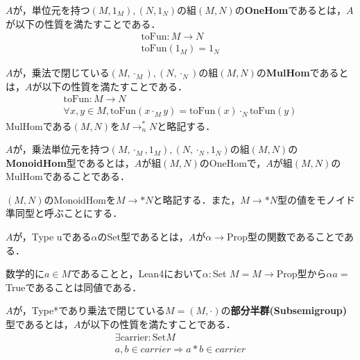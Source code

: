 \begin{definition}
    $A$が，単位元を持つ$(M,1_M),(N,1_N)$の組$(M,N)$の\textbf{OneHom}であるとは，$A$が以下の性質を満たすことである．
    \begin{align}
        \text{toFun} : M \rightarrow N\\
        \text{toFun}(1_M) = 1_N
    \end{align}
\end{definition}

\begin{definition}
    $A$が，乗法で閉じている$(M,\cdot_M),(N,\cdot_N)$の組$(M,N)$の\textbf{MulHom}であるとは，$A$が以下の性質を満たすことである．
    \begin{align}
        \text{toFun} : M \rightarrow N\\
        \forall x,y \in M,\text{toFun}(x\cdot_M y)=\text{toFun}(x)\cdot_N \text{toFun}(y)
    \end{align}
    MulHomである$(M,N)$を$M →^{*}_{n} N$と略記する．
\end{definition}


\begin{definition}
    $A$が，乗法単位元を持つ$(M,\cdot_M,1_M),(N,\cdot_N,1_N)$の組$(M,N)$の\textbf{MonoidHom}型であるとは，$A$が組$(M,N)$のOneHomで，$A$が組$(M,N)$のMulHomであることである．

    $(M,N)$のMonoidHomを$M →* N$と略記する．また，$M →* N$型の値をモノイド準同型と呼ぶことにする．
\end{definition}


\begin{definition}
    $A$が，Type uである$\alpha$のSet型であるとは，$A$が$\alpha\rightarrow$Prop型の関数であることである．

    数学的に$a \in M$であることと，Lean4において$\alpha : $Set $M = M\rightarrow$Prop型から$\alpha a = $Trueであることは同値である．
\end{definition}


\begin{definition}
    $A$が，Type*であり乗法で閉じている$M=(M,\cdot)$の\textbf{部分半群(Subsemigroup)}型であるとは，$A$が以下の性質を満たすことである．
    \begin{align}
        \exists\text{carrier} : \text{Set} M\\
        a,b \in carrier \Rightarrow a * b \in carrier
    \end{align}
\end{definition}

